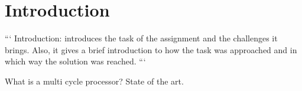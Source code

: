 \section{Introduction}

```
Introduction: introduces the task of the assignment and the challenges it brings.
Also, it gives a brief introduction to how the task was approached and in which way the solution was reached.
```

What is a multi cycle processor? State of the art.


